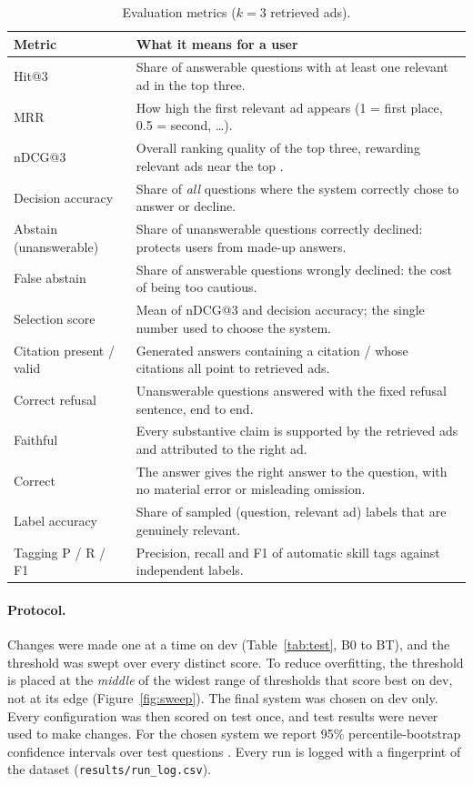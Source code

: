 \begin{table}[H]
\caption{Evaluation metrics ($k=3$ retrieved ads).}\label{tab:metrics}
\small
\begin{tabularx}{\linewidth}{lY}
\toprule
Metric & What it means for a user \\
\midrule
Hit@3 & Share of answerable questions with at least one relevant ad in the top three. \\
MRR & How high the first relevant ad appears (1 = first place, 0.5 = second, \dots). \\
nDCG@3 & Overall ranking quality of the top three, rewarding relevant ads near the top \citep{jarvelin2002ndcg}. \\
Decision accuracy & Share of \emph{all} questions where the system correctly chose to answer or decline. \\
Abstain (unanswerable) & Share of unanswerable questions correctly declined: protects users from made-up answers. \\
False abstain & Share of answerable questions wrongly declined: the cost of being too cautious. \\
Selection score & Mean of nDCG@3 and decision accuracy; the single number used to choose the system. \\
\midrule
Citation present / valid & Generated answers containing a citation / whose citations all point to retrieved ads. \\
Correct refusal & Unanswerable questions answered with the fixed refusal sentence, end to end. \\
Faithful & Every substantive claim is supported by the retrieved ads and attributed to the right ad. \\
Correct & The answer gives the right answer to the question, with no material error or misleading omission. \\
\midrule
Label accuracy & Share of sampled (question, relevant ad) labels that are genuinely relevant. \\
Tagging P / R / F1 & Precision, recall and F1 of automatic skill tags against independent labels. \\
\bottomrule
\end{tabularx}
\end{table}

\paragraph{Protocol.} Changes were made one at a time on dev (Table~\ref{tab:test}, B0 to BT), and the threshold was swept over every distinct score. To reduce overfitting, the threshold is placed at the \emph{middle} of the widest range of thresholds that score best on dev, not at its edge (Figure~\ref{fig:sweep}). The final system was chosen on dev only. Every configuration was then scored on test once, and test results were never used to make changes. For the chosen system we report 95\% percentile-bootstrap confidence intervals over test questions \citep{efron1993bootstrap}. Every run is logged with a fingerprint of the dataset (\texttt{results/run\_log.csv}).

